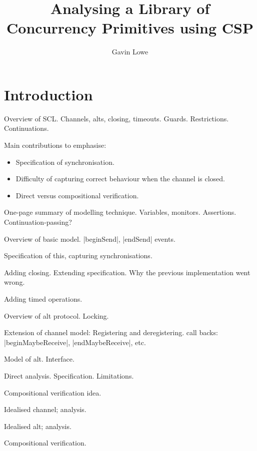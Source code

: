\documentclass[12pt,a4paper]{article}
\title{Analysing a Library of Concurrency Primitives using CSP}
\author{Gavin Lowe}
\begin{document}
\maketitle

\section{Introduction}

Overview of SCL.  Channels, alts, closing, timeouts.  Guards.  Restrictions.
Continuations. 

Main contributions to emphasise:
%
\begin{itemize}
\item Specification of synchronisation.

\item Difficulty of capturing correct behaviour when the channel is closed. 

\item Direct versus compositional verification. 

\end{itemize}

One-page summary of modelling technique.  Variables, monitors.  Assertions.
Continuation-passing? 

Overview of basic model.  |beginSend|, |endSend| events.

Specification of this, capturing synchronisations.

Adding closing.  Extending specification.  Why the previous implementation
went wrong. 

Adding timed operations.

Overview of alt protocol.  Locking. 

Extension of channel model:  Registering and deregistering.  call backs:
|beginMaybeReceive|, |endMaybeReceive|, etc. 

Model of alt.  Interface. 

Direct analysis.  Specification.  Limitations.

Compositional verification idea.

Idealised channel; analysis.

Idealised alt; analysis.

Compositional verification. 


\end{document}
